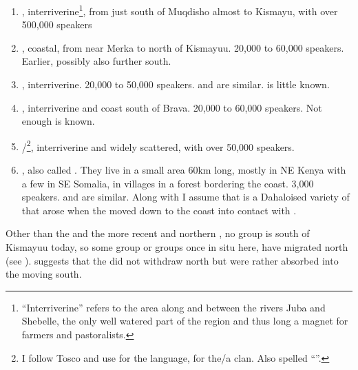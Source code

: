 \documentclass[output=paper
,newtxmath
,modfonts
,nonflat]{langsci/langscibook}
\begin{document}
\begin{enumerate}
\item  {}, interriverine\footnote{“Interriverine” refers to the area along and between the rivers Juba and Shebelle, the only well watered part of the region and thus long a magnet for farmers and pastoralists.}, from just south of Muqdisho almost to Kismayu, with over 500,000 speakers

\item {}, coastal, from near Merka to north of Kismayuu. 20,000 to 60,000 speakers. Earlier, possibly also further south. 

\item {}, interriverine. 20,000 to 50,000 speakers.  and  are similar.  is little known. 

\item {}, interriverine and coast south of Brava. 20,000 to 60,000 speakers. Not enough is known.

\item {}/\footnote{I follow Tosco and use  for the language,  for the/a clan. Also spelled “”.}, interriverine and widely scattered, with over 50,000 speakers.

\item {}, also called . They live in a small area 60km long, mostly in NE Kenya with a few in SE Somalia, in villages in a forest bordering the coast. 3,000 speakers.  and  are similar. Along with \citet{Tosco1994} I assume that  is a Dahaloised variety of  that arose when the  moved down to the coast into contact with .

\end{enumerate}

Other than the  and the more recent  and northern , no   group is south of Kismayuu today, so some group or groups once in situ here, have migrated north (see ). \citet{Ali1985} suggests that the  did not withdraw north but were rather absorbed into the  moving south. 
\end{document}
